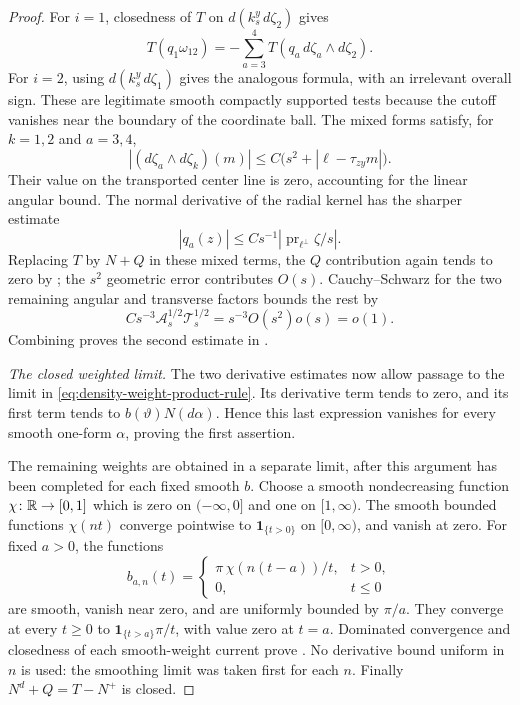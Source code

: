 \begin{proof}
For \(i=1\), closedness of \(T\) on \(d(k_s^y\,d\zeta_2)\) gives
\[
 T(q_1\omega_{12})
 =-\sum_{a=3}^4T(q_a\,d\zeta_a\wedge d\zeta_2).
\]
For \(i=2\), using \(d(k_s^y\,d\zeta_1)\) gives the analogous
formula, with an irrelevant overall sign.  These are legitimate
smooth compactly supported tests because the cutoff vanishes near
the boundary of the coordinate ball.
The mixed forms satisfy, for \(k=1,2\) and \(a=3,4\),
\begin{equation}\label{eq:density-mixed-form-error}
 |(d\zeta_a\wedge d\zeta_k)(m)|
 \le C\bigl(s^2+|\ell-\tau_{zy}m|\bigr).
\end{equation}
Their value on the transported center line is zero, accounting for
the linear angular bound.  The normal derivative of the radial
kernel has the sharper estimate
\begin{equation}\label{eq:density-normal-derivative}
 |q_a(z)|\le
 Cs^{-1}
 \left|\operatorname{pr}_{\ell^\perp}\zeta/s\right|.
\end{equation}
Replacing \(T\) by \(N+Q\) in these mixed terms, the \(Q\) contribution
again tends to zero by ; the \(s^2\)
geometric error contributes \(O(s)\).  Cauchy--Schwarz for the two
remaining angular and transverse factors bounds the rest by
\begin{equation}\label{eq:density-angular-transverse-product}
 Cs^{-3}\mathcal A_s^{1/2}\mathcal T_s^{1/2}
 =s^{-3}O(s^2)o(s)=o(1).
\end{equation}
Combining
proves the second estimate in
.

\smallskip
\noindent\emph{The closed weighted limit.}
The two derivative estimates now allow passage to the limit in
\eqref{eq:density-weight-product-rule}. Its derivative term tends
to zero, and its first term tends to
\(b(\vartheta)N(d\alpha)\). Hence this last expression vanishes
for every smooth one-form \(\alpha\), proving the first assertion.

The remaining weights are obtained in a separate limit, after this
argument has been completed for each fixed smooth \(b\).  Choose a
smooth nondecreasing function \(\chi\colon\mathbb R\to[0,1]\) which is zero
on \((-\infty,0]\) and one on \([1,\infty)\).
The smooth bounded functions \(\chi(nt)\) converge pointwise to
\(\mathbf1_{\{t>0\}}\) on \([0,\infty)\), and vanish at zero.
For fixed \(a>0\), the functions
\[
 b_{a,n}(t)=
 \begin{cases}
 \pi\,\chi(n(t-a))/t,&t>0,\\
 0,&t\le0
 \end{cases}
\]
are smooth, vanish near zero, and are uniformly bounded by \(\pi/a\).
They converge at every \(t\ge0\) to
\(\mathbf1_{\{t>a\}}\pi/t\), with value zero at \(t=a\).
Dominated convergence and closedness of each smooth-weight current
prove .  No derivative bound
uniform in \(n\) is used: the smoothing limit was taken first for
each \(n\).  Finally \(N^d+Q=T-N^+\) is closed.
\end{proof}


